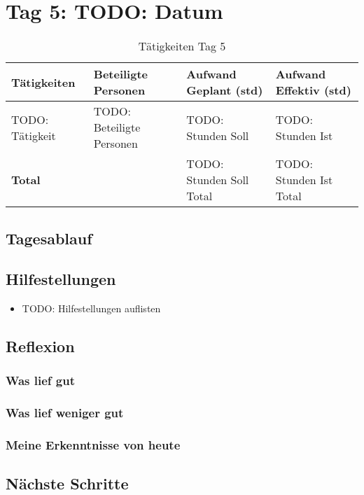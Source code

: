\section{Tag 5: TODO: Datum}
\begin{table}[H]
    \begin{tabular}{|L{0.4\textwidth}|C{60pt}|C{60pt}|C{60pt}|}
        \hline
        \color{white}Tätigkeiten & \color{white}Beteiligte \color{white}Personen & \color{white}Aufwand Geplant (std) & \color{white}Aufwand Effektiv (std) \\
        \hline
        TODO: Tätigkeit & TODO: Beteiligte Personen & TODO: Stunden Soll & TODO: Stunden Ist \\
        \hline
        \textbf{Total} & & TODO: Stunden Soll Total & TODO: Stunden Ist Total \\
        \hline
    \end{tabular}
    \caption{Tätigkeiten Tag 5}
\end{table}

\subsection*{Tagesablauf}


\subsection*{Hilfestellungen}
\begin{itemize}
    \item TODO: Hilfestellungen auflisten
\end{itemize}

\subsection*{Reflexion}
\subsubsection*{Was lief gut}

\subsubsection*{Was lief weniger gut}

\subsubsection*{Meine Erkenntnisse von heute}

\subsection*{Nächste Schritte}

\pagebreak
